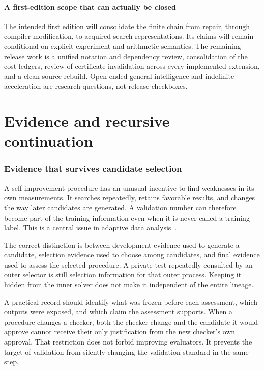 \documentclass[11pt,letterpaper]{article}
\theoremstyle{plain}
\theoremstyle{definition}
\begin{document}
\subsection{A first-edition scope that can actually be closed}
The intended first edition will consolidate the finite chain from repair, through compiler modification, to acquired search representations. Its claims will remain conditional on explicit experiment and arithmetic semantics. The remaining release work is a unified notation and dependency review, consolidation of the cost ledgers, review of certificate invalidation across every implemented extension, and a clean source rebuild. Open-ended general intelligence and indefinite acceleration are research questions, not release checkboxes.

\clearpage\part{Evidence and recursive continuation}
\section{Evidence that survives candidate selection}\label{sec:evidence}
A self-improvement procedure has an unusual incentive to find weaknesses in its own measurements. It searches repeatedly, retains favorable results, and changes the way later candidates are generated. A validation number can therefore become part of the training information even when it is never called a training label. This is a central issue in adaptive data analysis~\cite{dwork}.

The correct distinction is between development evidence used to generate a candidate, selection evidence used to choose among candidates, and final evidence used to assess the selected procedure. A private test repeatedly consulted by an outer selector is still selection information for that outer process. Keeping it hidden from the inner solver does not make it independent of the entire lineage.

A practical record should identify what was frozen before each assessment, which outputs were exposed, and which claim the assessment supports. When a procedure changes a checker, both the checker change and the candidate it would approve cannot receive their only justification from the new checker's own approval. That restriction does not forbid improving evaluators. It prevents the target of validation from silently changing the validation standard in the same step.
\end{document}
